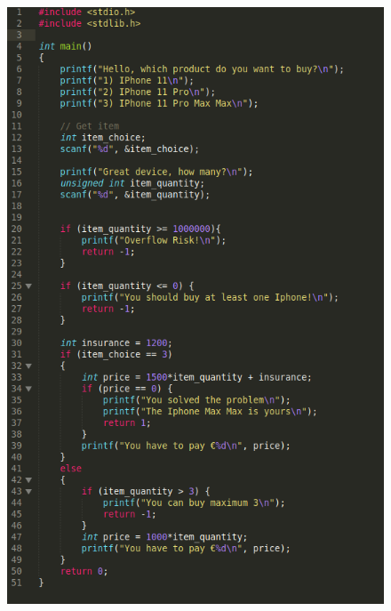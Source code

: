 \documentclass[11pt]{article}
\begin{document}
\begin{enumerate}
\begin{figure}
\centering
\includegraphics[scale=0.65]{image.png}
\end{figure}

\end{enumerate}
\end{document}
